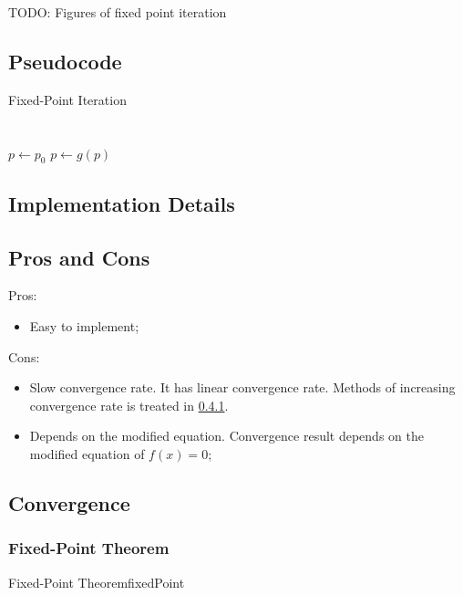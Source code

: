         TODO: Figures of fixed point iteration
    \subsection{Pseudocode}
        {Fixed-Point Iteration}
        {
             \\
             \\
             \\
        }
        {
        }
        {
            $p \leftarrow p_0$\;
            {
                $p \leftarrow g(p)$\;
                {
                     
                }
            }
        }
    \subsection{Implementation Details}
    \subsection{Pros and Cons}
        Pros:
        \begin{itemize}
            \item Easy to implement;
        \end{itemize}
        Cons:
        \begin{itemize}
            \item Slow convergence rate. It has linear convergence rate. Methods of increasing convergence rate is treated in \ref{}.
            \item Depends on the modified equation. Convergence result depends on the modified equation of $f(x)=0$;
        \end{itemize}
    \subsection{Convergence}
        \subsubsection{Fixed-Point Theorem}
            \begin{thm}{Fixed-Point Theorem}{fixedPoint}
            \end{thm}